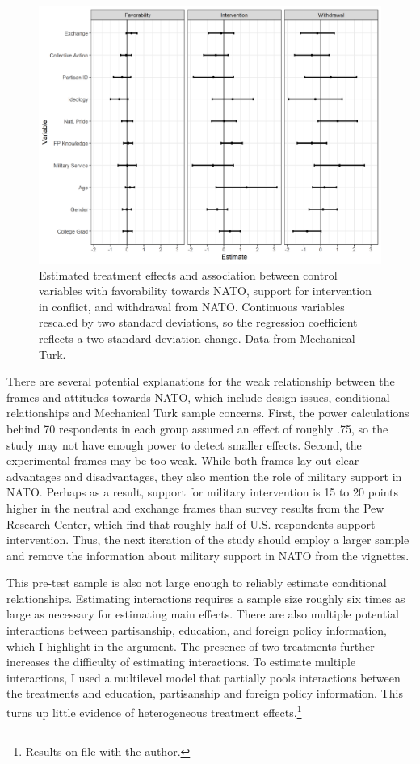 \documentclass[12pt]{article}
\begin{document}
\begin{figure}
\includegraphics[width = .95\textwidth]{../figures/mturk-res-both.png} 
\caption{Estimated treatment effects and association between control variables with favorability towards NATO, support for intervention in conflict, and withdrawal from NATO. Continuous variables rescaled by two standard deviations, so the regression coefficient reflects a two standard deviation change. Data from Mechanical Turk.}
\label{fig:mturk-res-both}
\end{figure}


There are several potential explanations for the weak relationship between the frames and attitudes towards NATO, which include design issues, conditional relationships and Mechanical Turk sample concerns.  
First, the power calculations behind 70 respondents in each group assumed an effect of roughly .75, so the study may not have enough power to detect smaller effects.
Second, the experimental frames may be too weak. 
While both frames lay out clear advantages and disadvantages, they also mention the role of military support in NATO. 
Perhaps as a result, support for military intervention is 15 to 20 points higher in the neutral and exchange frames than survey results from the Pew Research Center, which find that roughly half of U.S. respondents support intervention. 
Thus, the next iteration of the study should employ a larger sample and remove the information about military support in NATO from the vignettes. 


This pre-test sample is also not large enough to reliably estimate conditional relationships. 
Estimating interactions requires a sample size roughly six times as large as necessary for estimating main effects. 
There are also multiple potential interactions between partisanship, education, and foreign policy information, which I highlight in the argument. 
The presence of two treatments further increases the difficulty of estimating interactions. 
To estimate multiple interactions, I used a multilevel model that partially pools interactions between the treatments and education, partisanship and foreign policy information.
This turns up little evidence of heterogeneous treatment effects.\footnote{Results on file with the author.}
\end{document}

